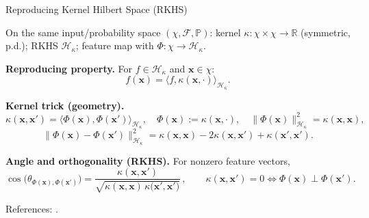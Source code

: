 \documentclass[aspectratio=169]{beamer}
\let\oldcite\cite %
\renewcommand{\cite}[1]{{\tiny\oldcite{#1}}}
\begin{document}
\begin{frame}{Reproducing Kernel Hilbert Space (RKHS)}

On the same input/probability space $(\chi,\mathcal{F},\mathbb{P})$:
kernel $\kappa:\chi\times\chi\to\mathbb{R}$ (symmetric, p.d.);
RKHS $\mathcal{H}_{\kappa}$; feature map  with $\Phi:\chi\to\mathcal{H}_\kappa$.

\medskip
\textbf{Reproducing property.}
For $f\in\mathcal{H}_{\kappa}$ and $\mathbf{x}\in\chi$:
\[
f(\mathbf{x})=\langle f,\kappa(\mathbf{x},\cdot)\rangle_{\mathcal{H}_{\kappa}}.
\]

\medskip
\textbf{Kernel trick (geometry).}
\[
\kappa(\mathbf{x},\mathbf{x}')=\langle \Phi(\mathbf{x}),\Phi(\mathbf{x}')\rangle_{\mathcal{H}_{\kappa}}, 
\quad \Phi(\mathbf{x}):=\kappa(\mathbf{x},\cdot), \quad
\|\Phi(\mathbf{x})\|_{\mathcal{H}_{\kappa}}^{2}=\kappa(\mathbf{x},\mathbf{x}),
\]
\[
\|\Phi(\mathbf{x})-\Phi(\mathbf{x}')\|_{\mathcal{H}_{\kappa}}^{2}
=\kappa(\mathbf{x},\mathbf{x})-2\kappa(\mathbf{x},\mathbf{x}')+\kappa(\mathbf{x}',\mathbf{x}').
\]

\medskip
\textbf{Angle and orthogonality (RKHS).}
For nonzero feature vectors,
\[
\cos\!\bigl(\theta_{\Phi(\mathbf{x}),\Phi(\mathbf{x}')}\bigr)
=\frac{\kappa(\mathbf{x},\mathbf{x}')}{\sqrt{\kappa(\mathbf{x},\mathbf{x})\,\kappa(\mathbf{x}',\mathbf{x')}}}\,,
\qquad
\kappa(\mathbf{x},\mathbf{x}')=0 \Longleftrightarrow \Phi(\mathbf{x})\perp \Phi(\mathbf{x}').
\]

\medskip
\footnotesize References: \cite{scholkopf2018learning}.
\end{frame}
\end{document}
